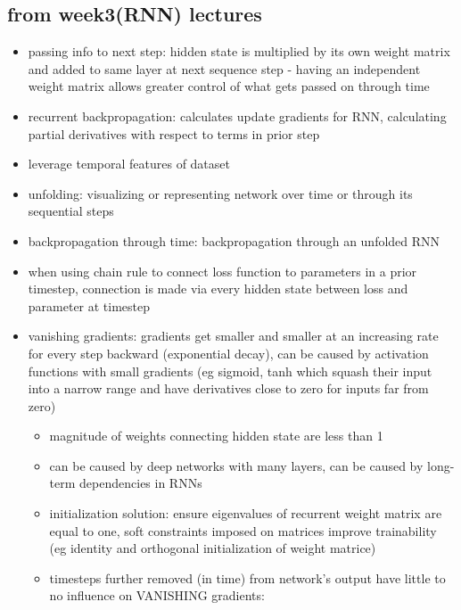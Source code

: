 \documentclass[10pt]{article}
\begin{document}
\subsection*{from week3(RNN) lectures}
\begin{itemize}[label=\(\star\), leftmargin=1em, itemsep=-0.3em]
    \item passing info to next step: hidden state is multiplied by its own weight matrix and added to same layer at next sequence step - having an independent weight matrix allows greater control of what gets passed on through time
    \item recurrent backpropagation: calculates update gradients for RNN, calculating partial derivatives with respect to terms in prior step
    \item leverage temporal features of dataset
    \item unfolding: visualizing or representing network over time or through its sequential steps
    \item backpropagation through time: backpropagation through an unfolded RNN
    \item when using chain rule to connect loss function to parameters in a prior timestep, connection is made via every hidden state between loss and parameter at timestep
    \item vanishing gradients: gradients get smaller and smaller at an increasing rate for every step backward (exponential decay), can be caused by activation functions with small gradients (eg sigmoid, tanh which squash their input into a narrow range and have derivatives close to zero for inputs far from zero)
        \begin{itemize}[label=\(\star\), leftmargin=1em, itemsep=-0.3em]
            \item magnitude of weights connecting hidden state are less than 1
            \item can be caused by deep networks with many layers, can be caused by long-term dependencies in RNNs
            \item initialization solution: ensure eigenvalues of recurrent weight matrix are equal to one, soft constraints imposed on matrices improve trainability (eg identity and orthogonal initialization of weight matrice)
            \item timesteps further removed (in time) from network's output have little to no influence on VANISHING gradients:
                \begin{itemize}[label=\(\star\), leftmargin=1em, itemsep=-0.3em]

\end{itemize}
\end{itemize}
\end{itemize}
\end{document}
